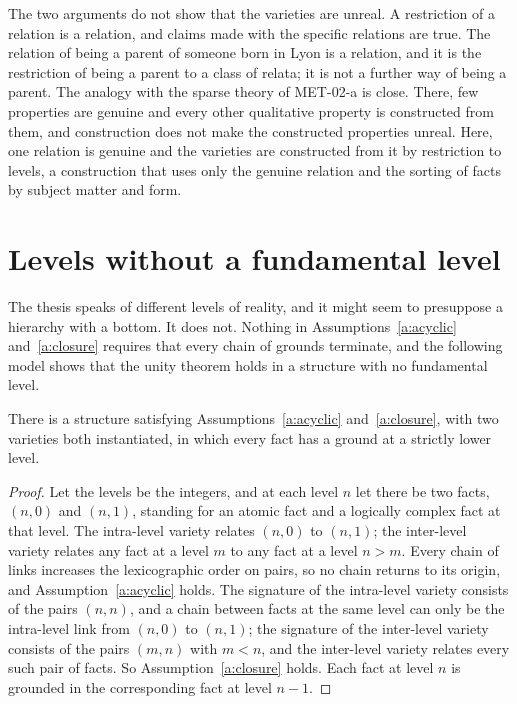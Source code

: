 \documentclass{situationist-preprint}
\begin{document}
The two arguments do not show that the varieties are unreal. A restriction of a relation is a relation, and claims made with the specific relations are true. The relation of being a parent of someone born in Lyon is a relation, and it is the restriction of being a parent to a class of relata; it is not a further way of being a parent. The analogy with the sparse theory of MET-02-a is close. There, few properties are genuine and every other qualitative property is constructed from them, and construction does not make the constructed properties unreal. Here, one relation is genuine and the varieties are constructed from it by restriction to levels, a construction that uses only the genuine relation and the sorting of facts by subject matter and form.

\section{Levels without a fundamental level}\label{s:levels}

The thesis speaks of different levels of reality, and it might seem to presuppose a hierarchy with a bottom. It does not. Nothing in Assumptions~\ref{a:acyclic} and~\ref{a:closure} requires that every chain of grounds terminate, and the following model shows that the unity theorem holds in a structure with no fundamental level.

\begin{proposition}\label{p:descent}
There is a structure satisfying Assumptions~\ref{a:acyclic} and~\ref{a:closure}, with two varieties both instantiated, in which every fact has a ground at a strictly lower level.
\end{proposition}

\begin{proof}
Let the levels be the integers, and at each level $n$ let there be two facts, $(n, 0)$ and $(n, 1)$, standing for an atomic fact and a logically complex fact at that level. The intra-level variety relates $(n, 0)$ to $(n, 1)$; the inter-level variety relates any fact at a level $m$ to any fact at a level $n > m$. Every chain of links increases the lexicographic order on pairs, so no chain returns to its origin, and Assumption~\ref{a:acyclic} holds. The signature of the intra-level variety consists of the pairs $(n,n)$, and a chain between facts at the same level can only be the intra-level link from $(n,0)$ to $(n,1)$; the signature of the inter-level variety consists of the pairs $(m,n)$ with $m < n$, and the inter-level variety relates every such pair of facts. So Assumption~\ref{a:closure} holds. Each fact at level $n$ is grounded in the corresponding fact at level $n - 1$.
\end{proof}
\end{document}
